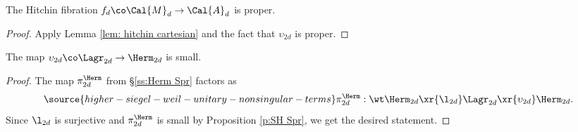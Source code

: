 \begin{cor}
\notready\label{c: hitchin proper}
The Hitchin fibration $f_{d} \co \Cal{M}_{d} \rightarrow \Cal{A}_{d}$ is proper.
\end{cor}
\begin{proof}Apply Lemma \ref{lem: hitchin cartesian} and the fact that $\upsilon_{2d}$ is proper.
\end{proof}



\begin{lemma}
\notready\label{l:Lag small}
The map $\upsilon_{2d} \co \Lagr_{2d} \rightarrow \Herm_{2d}$ is small.
\end{lemma}
\begin{proof}
The map $\pi^{\Herm}_{2d}$ from \S\ref{ss:Herm Spr} factors as
\begin{equation}\label{factor pi Herm}
\source{higher-siegel-weil-unitary-nonsingular-terms}
\pi^{\Herm}_{2d}: \wt\Herm_{2d}\xr{\l_{2d}}\Lagr_{2d}\xr{\upsilon_{2d}}\Herm_{2d}.
\end{equation}
Since $\l_{2d}$ is surjective and $\pi^{\Herm}_{2d}$ is small by Proposition \ref{p:SH Spr}, we get the desired statement.
\end{proof}


